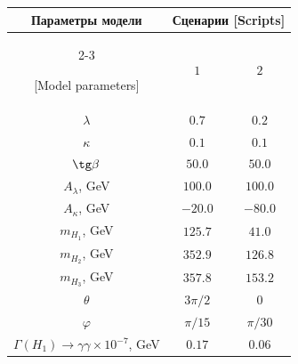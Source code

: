 \begin{table}[b!]

\centering

\small

\begin{tabular}{c|c|c}

\hline

\footnotesize

Параметры модели  & \multicolumn{2}{c}{\footnotesize Сценарии [Scripts]} \\

\cline{2-3}

\footnotesize

[Model parameters]  & \footnotesize  $1$ & \footnotesize $2$ \\

\hline

\rule{0mm}{12pt}%

 $\lambda$  &   $0.7$ &   $0.2$ \\ 

$\kappa$  &  $0.1$ &  $0.1$ \\

$\tg\beta$    &  $50.0$ &  $50.0$

\\

$A_{\lambda}$, GeV   &   $100.0$ &   $100.0$

\\

$A_{\kappa}$, GeV   &  $-20.0$ &  $-80.0$

\\

$m_{H_{1}}$, GeV &  $125.7$ &  $41.0$

\\

$m_{H_{2}}$, GeV  &  $352.9$ &  $126.8$

\\

$m_{H_{3}}$, GeV &  $357.8$ &  $153.2$

\\

$\theta$   & ${3\pi}/{2}$ & $0$

\\

$\varphi$   & ${\pi}/{15}$ & ${\pi}/{30}$

\\

$\Gamma (H_1)\rightarrow \gamma \gamma \times 10^{-7}$, GeV & $0.17$ & $0.06$

\\


\end{tabular}
\end{table}
